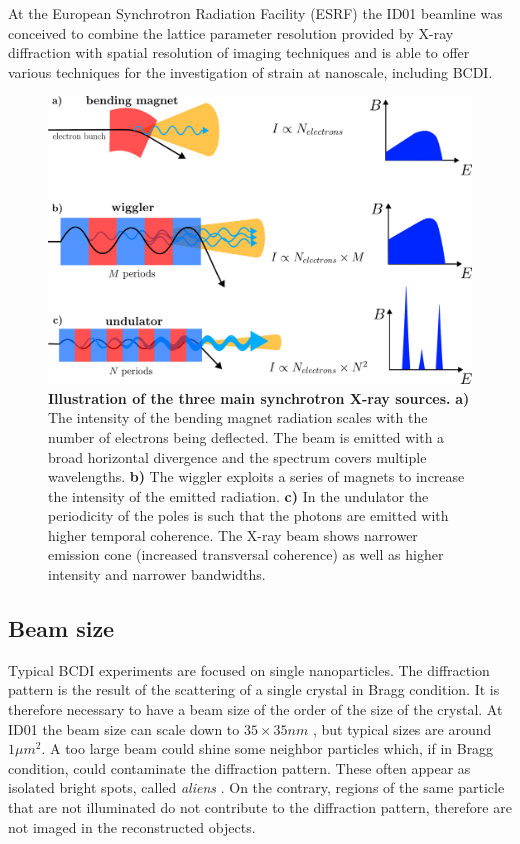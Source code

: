 At the European Synchrotron Radiation Facility (ESRF) the ID01 beamline was conceived to combine the lattice parameter 
resolution provided by X-ray diffraction with spatial resolution of imaging techniques \cite{leake_nanodiffraction_2019} and 
is able to offer various techniques for the investigation of strain at nanoscale, including BCDI. 

\begin{figure}[H]
    \centering
    \includegraphics[width=\textwidth]{figures/Intro/synchrotron.pdf}
    \caption{\textbf{Illustration of the three main synchrotron X-ray sources.} \textbf{a)} The intensity of the 
    bending magnet radiation scales with the number of electrons being deflected. The beam is emitted with a broad 
    horizontal divergence and the spectrum covers multiple wavelengths. \textbf{b)} The wiggler exploits a series of 
    magnets to increase the intensity of the emitted radiation. \textbf{c)} In the undulator the periodicity of the poles 
    is such that the photons are emitted with higher temporal coherence. The X-ray beam shows narrower emission cone (increased 
    transversal coherence) as well as higher intensity and narrower bandwidths.}
    \label{fig:synchrotron}
\end{figure}

\subsection{Beam size}

Typical BCDI experiments are focused on single nanoparticles. The diffraction pattern is the result of the scattering of 
a single crystal in Bragg condition. It is therefore necessary to have a beam size of the order of the size of the crystal. 
At ID01 the beam size can scale down to $35 \times 35 nm$ \cite{esrf_id01}, but typical sizes are around $ 1 \mu m^2$. 
A too large beam could shine some neighbor particles which, if in Bragg condition, could contaminate the diffraction pattern. 
These often appear as isolated bright spots, called \textit{aliens} \cite{Pelzer:te5062}. On the contrary, regions of the same particle that 
are not illuminated do not contribute to the diffraction pattern, therefore are not imaged in the reconstructed objects. 


